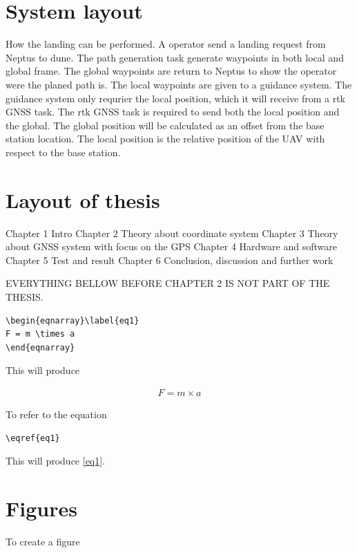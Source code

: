 \section{System layout}
How the landing can be performed. A operator send a landing request from Neptus to dune. The path generation task generate waypoints in both local and global frame. The global waypoints are return to Neptus to show the operator were the planed path is. The local waypoints are given to a guidance system. The guidance system only requrier the local position, which it will receive from a rtk GNSS task. The rtk GNSS task is required to send both the local position and the global. The global position will be calculated as an offset from the base station location. The local position is the relative position of the UAV with respect to the base station.
\section{Layout of thesis}
Chapter 1 Intro
Chapter 2 Theory about coordinate system
Chapter 3 Theory about GNSS system with focus on the GPS
Chapter 4 Hardware and software
Chapter 5 Test and result
Chapter 6 Conclusion, discussion and further work


EVERYTHING BELLOW BEFORE CHAPTER 2 IS NOT PART OF THE THESIS.
\begin{verbatim}
\begin{eqnarray}\label{eq1}
F = m \times a
\end{eqnarray}
\end{verbatim}

\noindent This will produce

\begin{eqnarray}\label{eq1}
F = m \times a
\end{eqnarray}

\noindent To refer to the equation

\begin{verbatim}
\eqref{eq1}
\end{verbatim}

\noindent This will produce \eqref{eq1}.


\section{Figures}
To create a figure

